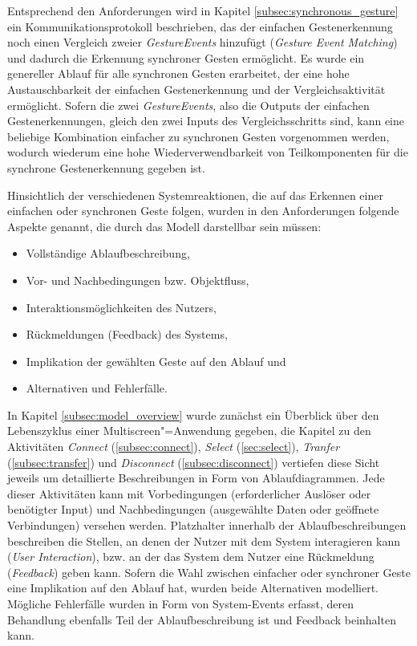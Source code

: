 Entsprechend den Anforderungen wird in Kapitel \ref{subsec:synchronous_gesture} ein Kommunikationsprotokoll beschrieben, das der einfachen Gestenerkennung noch einen Vergleich zweier \textit{GestureEvents} hinzufügt (\textit{Gesture Event Matching}) und dadurch die Erkennung synchroner Gesten ermöglicht. Es wurde ein genereller Ablauf für alle synchronen Gesten erarbeitet, der eine hohe Austauschbarkeit der einfachen Gestenerkennung und der Vergleichsaktivität ermöglicht. Sofern die zwei \textit{GestureEvents}, also die Outputs der einfachen Gestenerkennungen, gleich den zwei Inputs des Vergleichsschritts sind, kann eine beliebige Kombination einfacher zu synchronen Gesten vorgenommen werden, wodurch wiederum eine hohe Wiederverwendbarkeit von Teilkomponenten für die synchrone Gestenerkennung gegeben ist.

Hinsichtlich der verschiedenen Systemreaktionen, die auf das Erkennen einer einfachen oder synchronen Geste folgen, wurden in den Anforderungen folgende Aspekte genannt, die durch das Modell darstellbar sein müssen:
\begin{itemize}
\item Vollständige Ablaufbeschreibung,
\item Vor- und Nachbedingungen bzw. Objektfluss,
\item Interaktionsmöglichkeiten des Nutzers,
\item Rückmeldungen (Feedback) des Systems,
\item Implikation der gewählten Geste auf den Ablauf und
\item Alternativen und Fehlerfälle.
\end{itemize}

In Kapitel \ref{subsec:model_overview} wurde zunächst ein Überblick über den Lebenszyklus einer Mul\-ti\-screen"=Anwendung gegeben, die Kapitel zu den Aktivitäten \textit{Connect} (\ref{subsec:connect}), \textit{Select} (\ref{sec:select}), \textit{Tranfer} (\ref{subsec:transfer}) und \textit{Disconnect} (\ref{subsec:disconnect}) vertiefen diese Sicht jeweils um detaillierte Beschreibungen in Form von Ablaufdiagrammen. Jede dieser Aktivitäten kann mit Vorbedingungen (\zb erforderlicher Auslöser oder benötigter Input) und Nachbedingungen (\zb ausgewählte Daten oder geöffnete Verbindungen) versehen werden. Platzhalter innerhalb der Ablaufbeschreibungen beschreiben die Stellen, an denen der Nutzer mit dem System interagieren kann (\textit{User Interaction}), bzw. an der das System dem Nutzer eine Rückmeldung (\textit{Feedback}) geben kann. Sofern die Wahl zwischen einfacher oder synchroner Geste eine Implikation auf den Ablauf hat, wurden beide Alternativen modelliert. Mögliche Fehlerfälle wurden in Form von System-Events erfasst, deren Behandlung ebenfalls Teil der Ablaufbeschreibung ist und Feedback beinhalten kann.
 
